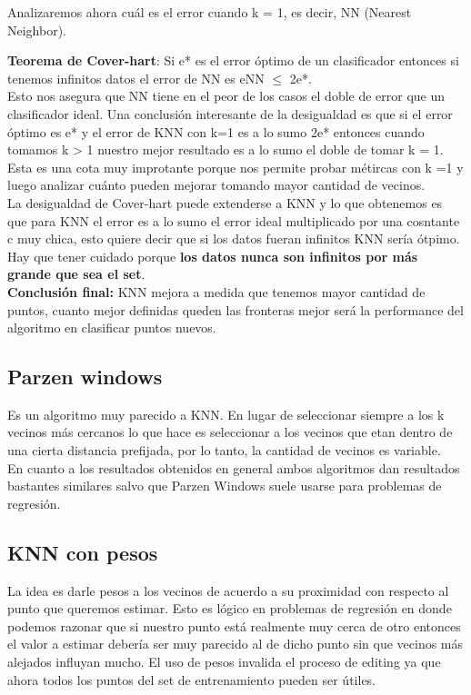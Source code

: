 \documentclass[titlepage,a4paper]{article}
\begin{document}
Analizaremos ahora cuál es el error cuando k = 1, es decir, NN (Nearest Neighbor).

\textbf{Teorema de Cover-hart}: Si e* es el error óptimo de un clasificador entonces si tenemos infinitos datos el error de NN es eNN $\leq$ 2e*. \\

Esto nos asegura que NN tiene en el peor de los casos el doble de error que un clasificador ideal. Una conclusión interesante de la desigualdad es que si el error óptimo es e* y el error de KNN con k=1 es a lo sumo 2e* entonces cuando tomamos k > 1 nuestro mejor resultado es a lo sumo el doble de tomar k = 1.   Esta es una cota muy improtante porque nos permite probar métircas con k =1 y luego analizar cuánto pueden mejorar tomando mayor cantidad de vecinos. \\

La desigualdad de Cover-hart puede extenderse a KNN y lo que obtenemos es que para KNN el error es a lo sumo el error ideal multiplicado por una cosntante c muy chica, esto quiere decir que si los datos fueran infinitos KNN sería ótpimo. Hay que tener cuidado porque \textbf{los datos nunca son infinitos por más grande que sea el set}.\\

\textbf{Conclusión final:} KNN  mejora a medida que tenemos mayor cantidad de puntos, cuanto mejor definidas queden las fronteras mejor será la performance del algoritmo en clasificar puntos nuevos. 

\subsection*{Parzen windows}
Es un algoritmo muy parecido a KNN. En lugar de seleccionar siempre a los k vecinos más cercanos lo que hace es seleccionar a los vecinos que etan dentro de una cierta distancia prefijada, por lo tanto, la cantidad de vecinos es variable. \\

En cuanto a los resultados obtenidos en general ambos algoritmos dan resultados bastantes similares salvo que Parzen Windows suele usarse para problemas de regresión. 

\subsection*{KNN con pesos}
La idea es darle pesos a los vecinos de acuerdo a su proximidad con respecto al punto que queremos estimar. Esto es lógico en problemas de regresión en donde podemos razonar que si nuestro punto está realmente muy cerca de otro entonces el valor a estimar debería ser muy parecido al de dicho punto sin que vecinos más alejados influyan mucho. El uso de pesos invalida el proceso de editing ya que ahora todos los puntos del set de entrenamiento pueden ser útiles. \\
\end{document}
